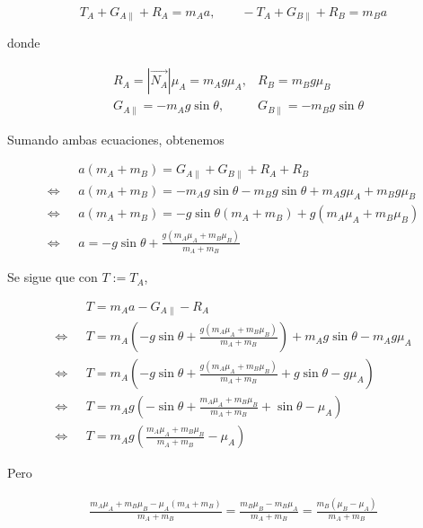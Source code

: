 \documentclass[12pt]{article}
\theoremstyle{definition}
\begin{document}
\begin{equation*}
    T_A + G_{A \parallel } + R_{A} = m_A a, \qquad -T_A + G_{B \parallel} + R_B = m_B a
\end{equation*}

donde 

\begin{align*}
&R_A = \left| \vec{N_A} \right|\mu_A = m_A g \mu_A, &R_B = m_B g
\mu_B \\ 
&G_{A \parallel} = -m_Ag \sin \theta,  &G_{B \parallel} = -m_B g \sin \theta
\end{align*}

Sumando ambas ecuaciones, obtenemos 

\begin{align*}
    &a(m_A + m_B) = G_{A \parallel} + G_{B \parallel} + R_A + R_B\\ 
    \iff  ~ ~ ~ 
    &a(m_A + m_B) = -m_A g \sin \theta - m_B g \sin \theta + m_A g \mu_A + m_B g
    \mu_B \\ 
    \iff ~ ~ ~ 
    &a(m_A + m_B) = -g\sin \theta\left( m_A + m_B \right)  + g\left( m_A \mu_A +
    m_B \mu_B\right) \\ 
    \iff ~ ~ ~ 
    &a = -g\sin \theta + \frac{g(m_A \mu_A + m_B \mu_B)}{m_A + m_B}
\end{align*}

Se sigue que con $T := T_A$, 

\begin{align*}
    &T = m_A a - G_{A \parallel} - R_A \\ 
    \iff ~ ~ ~ 
    &T = m_A \left( -g \sin \theta + \frac{g(m_A \mu_A + m_B \mu_B)}{m_A + m_B}
    \right) + m_A g \sin \theta - m_A g \mu_A  \\ 
    \iff ~ ~ ~ 
    &T = m_A \left( -g \sin \theta + \frac{g(m_A \mu_A + m_B \mu_B)}{m_A + m_B}
    + g \sin \theta - g\mu_A\right) \\ 
    \iff ~ ~ ~ 
    &T = m_Ag \left( -\sin \theta + \frac{m_A \mu_A + m_B \mu_B}{m_A + m_B}
    + \sin \theta - \mu_A\right) \\ 
    \iff ~ ~ ~ 
    &T = m_Ag \left(\frac{m_A \mu_A + m_B \mu_B}{m_A + m_B}
     - \mu_A\right) 
\end{align*}

Pero 

\begin{align*}
    \frac{m_A \mu_A + m_B\mu_B - \mu_A(m_A + m_B)}{m_A + m_B} 
    = \frac{m_B \mu_B - m_B\mu_A}{m_A + m_B} = \frac{m_B(\mu_B - \mu_A)}{m_A +
    m_B}
\end{align*}
\end{document}
